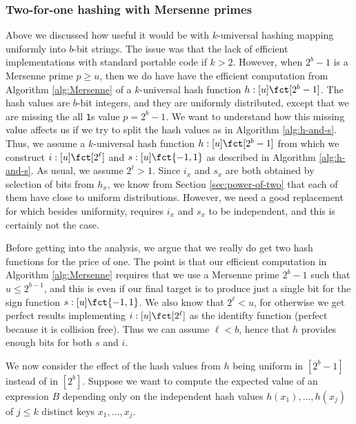 \subsubsection{Two-for-one hashing with  Mersenne primes}\label{sec:two-for-one}
Above we discussed how useful it would be with $k$-universal hashing
mapping uniformly into $b$-bit strings. The issue was that the lack of
efficient implementations with standard portable code if
$k>2$. However, when $2^b-1$ is a Mersenne prime $p\geq u$, then we do
have have the efficient computation from Algorithm \ref{alg:Mersenne}
of a $k$-universal hash function $h:[u]\fct[2^b-1]$. The hash values
are $b$-bit integers, and they are uniformly distributed, except that
we are missing the all \texttt{1}s value $p=2^b-1$. We want to
understand how this missing value affects us if we try to split the
hash values as in Algorithm \ref{alg:h-and-s}. Thus, we assume a
$k$-universal hash function $h:[u]\fct[2^b-1]$ from which we construct
$i:[u]\fct[2^\ell]$ and $s:[u]\fct\{-1,1\}$ as
described in Algorithm \ref{alg:h-and-s}. As usual, we assume $2^\ell>1$.
Since $i_x$ and $s_x$ are
both obtained by selection of bits from $h_x$, we know from Section
\ref{sec:power-of-two} that each of them have close to uniform
distributions. However, we need a good replacement for 
which besides uniformity, requires $i_x$ and $s_x$ to be independent,
and this is certainly not the case.

Before getting into the analysis, we argue that we really do get two
hash functions for the price of one. The point is that our efficient
computation in Algorithm \ref{alg:Mersenne} requires that we use a
Mersenne prime $2^b-1$ such that $u\leq 2^{b-1}$, and this is even if
our final target is to produce just a single bit for the sign function
$s:[u]\fct\{-1,1\}$. We also know that $2^\ell<u$, for otherwise we
get perfect results implementing $i:[u]\fct[2^\ell]$ as the identifty
function (perfect because it is collision free).  Thus we can assume
$\ell<b$, hence that $h$ provides enough bits for both $s$ and $i$.


We now consider the effect of the hash values from $h$ being uniform
in $[2^b-1]$ instead of in $[2^b]$. Suppose we want to compute the
expected value of an expression $B$ depending only on the independent
hash values $h(x_1),\ldots,h(x_j)$ of $j\leq k$ distinct keys
$x_1,\ldots,x_j$.

